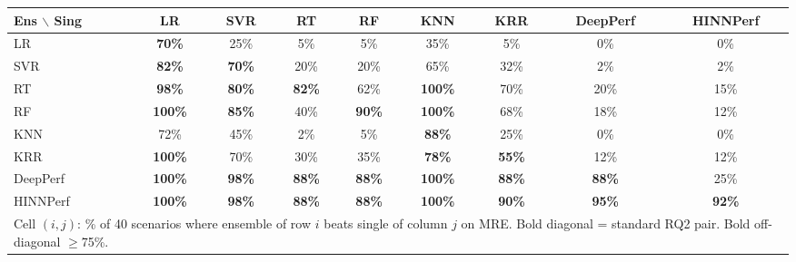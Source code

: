 \begin{tabular}{lcccccccc}
\toprule
Ens $\backslash$ Sing & LR & SVR & RT & RF & KNN & KRR & DeepPerf & HINNPerf \\
\midrule
LR & \textbf{70\%} & 25\% & 5\% & 5\% & 35\% & 5\% & 0\% & 0\% \\
SVR & \textbf{82\%} & \textbf{70\%} & 20\% & 20\% & 65\% & 32\% & 2\% & 2\% \\
RT & \textbf{98\%} & \textbf{80\%} & \textbf{82\%} & 62\% & \textbf{100\%} & 70\% & 20\% & 15\% \\
RF & \textbf{100\%} & \textbf{85\%} & 40\% & \textbf{90\%} & \textbf{100\%} & 68\% & 18\% & 12\% \\
KNN & 72\% & 45\% & 2\% & 5\% & \textbf{88\%} & 25\% & 0\% & 0\% \\
KRR & \textbf{100\%} & 70\% & 30\% & 35\% & \textbf{78\%} & \textbf{55\%} & 12\% & 12\% \\
DeepPerf & \textbf{100\%} & \textbf{98\%} & \textbf{88\%} & \textbf{88\%} & \textbf{100\%} & \textbf{88\%} & \textbf{88\%} & 25\% \\
HINNPerf & \textbf{100\%} & \textbf{98\%} & \textbf{88\%} & \textbf{88\%} & \textbf{100\%} & \textbf{90\%} & \textbf{95\%} & \textbf{92\%} \\
\bottomrule
\multicolumn{9}{l}{\footnotesize Cell $(i,j)$: \% of 40 scenarios where ensemble of row $i$ beats single of column $j$ on MRE. Bold diagonal = standard RQ2 pair. Bold off-diagonal $\geq$75\%.} \\
\end{tabular}

